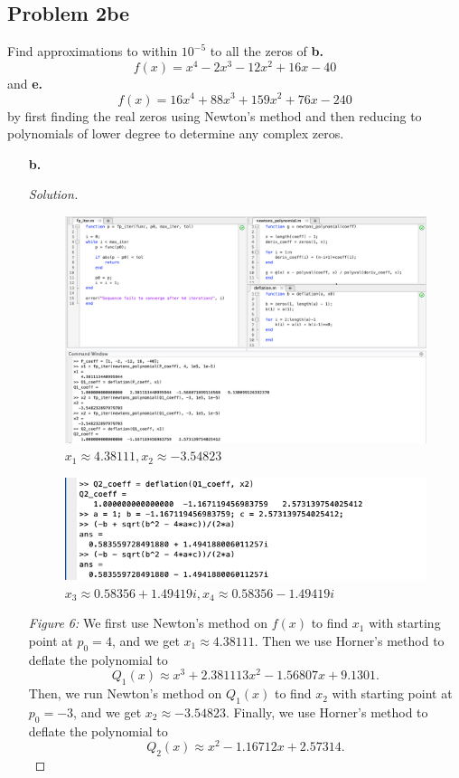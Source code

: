 \documentclass{article}
\begin{document}
\subsection*{Problem 2be}
Find approximations to within $10^{-5}$ to all the zeros of \textbf{b.} 
$$f(x)=x^4-2x^3-12x^2+16x-40$$ and \textbf{e.} 
$$f(x)=16x^4+88x^3+159x^2+76x-240$$ by first finding the real zeros using Newton's method and then
reducing to polynomials of lower degree to determine any complex zeros.
\begin{enumerate}
    \item[\textbf{b.}]
    \begin{proof}[Solution]\indent
        \begin{figure}[htb!]
            \centering
            \includegraphics[scale=0.25]{2.6.2b_1.png}
            \caption{$x_1 \approx 4.38111, x_2 \approx -3.54823$}
        \end{figure}
        \begin{figure}[htb!]
            \centering
            \includegraphics[scale=0.5]{2.6.2b_2.png}
            \caption{$x_3\approx0.58356 + 1.49419i, x_4 \approx 0.58356 - 1.49419i$}
        \end{figure}
        
        \emph{Figure 6:} We first use Newton's method on $f(x)$ to find $x_1$ with starting point at $p_0=4$, and we get 
        $x_1\approx4.38111$. Then we use Horner's method to deflate the polynomial to 
        $$Q_1(x) \approx x^3 + 2.381113x^2 - 1.56807x + 9.1301.$$
        Then, we run Newton's method on $Q_1(x)$ to find $x_2$ with starting point at $p_0=-3$, and 
        we get $x_2\approx-3.54823$. Finally, we use Horner's method to deflate the polynomial to 
        $$Q_2(x) \approx x^2 - 1.16712x + 2.57314.$$
        

\end{proof}
\end{enumerate}
\end{document}
